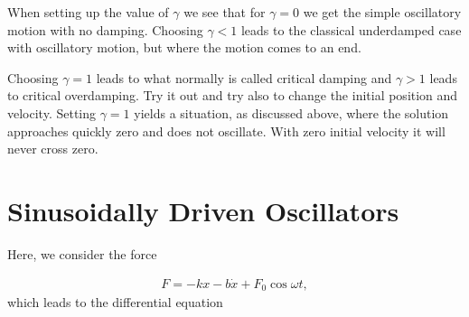 \documentclass[letterpaper,10pt,english]{sphinxmanual}
\begin{document}
\begin{sphinxVerbatim}[commandchars=\\\{\}]
   
 
\end{sphinxVerbatim}

When setting up the value of \(\gamma\) we see that for \(\gamma=0\) we get the simple oscillatory motion with no damping.
Choosing \(\gamma < 1\) leads to the classical underdamped case with oscillatory motion, but where the motion comes to an end.

Choosing \(\gamma =1\) leads to what normally is called critical damping and \(\gamma> 1\) leads to critical overdamping.
Try it out and try also to change the initial position and velocity. Setting \(\gamma=1\)
yields a situation, as discussed above, where the solution approaches quickly zero and does not oscillate. With zero initial velocity it will never cross zero.


\section{Sinusoidally Driven Oscillators}
\label{\detokenize{chapter1:sinusoidally-driven-oscillators}}
Here, we consider the force




\begin{equation*}
\begin{split}
\begin{equation}
F=-kx-b\dot{x}+F_0\cos\omega t,
\label{_auto44} \tag{57}
\end{equation}
\end{split}
\end{equation*}
which leads to the differential equation
\end{document}
